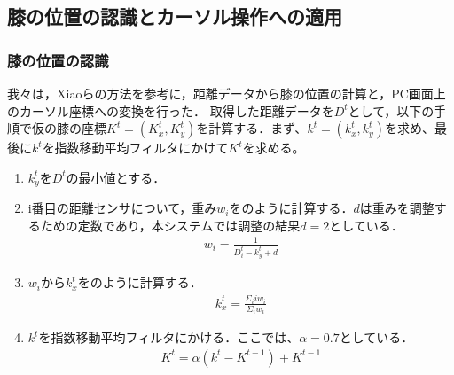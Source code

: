 \documentclass[submit, techrep]{ipsj}
\begin{document}

\subsection{膝の位置の認識とカーソル操作への適用}
\subsubsection{膝の位置の認識}
我々は，Xiao\cite{Xiao:2018:LOP:3173574.3173669}らの方法を参考に，距離データから膝の位置の計算と，PC画面上のカーソル座標への変換を行った．
取得した距離データを$D^t$として，以下の手順で仮の膝の座標$K^t=(K^t_x, K^t_y)$を計算する．まず、$k^t=(k^t_x, k^t_y)$を求め、最後に$k^t$を指数移動平均フィルタにかけて$K^t$を求める。
\begin{enumerate}
	\item $k^t_y$を$D^t$の最小値とする．
	\item i番目の距離センサについて，重み$w_i$をのように計算する．$d$は重みを調整するための定数であり，本システムでは調整の結果$d=2$としている．
	\begin{eqnarray}
		\label{eq:weight}
		w_i = \frac{1}{D^t_i - k^t_y + d}
	\end{eqnarray}
	\item $w_i$から$k^t_x$をのように計算する．
	\begin{eqnarray}
		\label{eq:calc_x}
			k^t_x = \frac{\Sigma_i iw_i}{\Sigma_i w_i}
	\end{eqnarray}
	\item $k^t$を指数移動平均フィルタにかける．ここでは、$\alpha=0.7$としている．
\begin{eqnarray}
	\label{eq:filter}
	K^t = \alpha (k^t - K^{t-1}) + K^{t-1}
	\end{eqnarray}
\end{enumerate}
\end{document}

